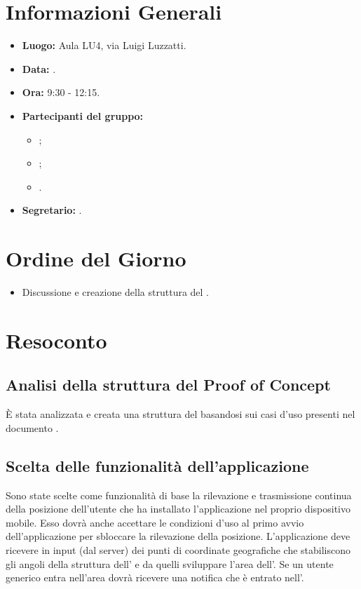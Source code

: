 \section{Informazioni Generali}
\begin{itemize}
\item \textbf{Luogo:} Aula LU4, via Luigi Luzzatti.
\item \textbf{Data:} \Data.
\item \textbf{Ora:} 9:30 - 12:15.
\item \textbf{Partecipanti del gruppo:}
	\begin{itemize}
		\item \DF{};
		\item \MC{};
		\item \SE{}.
	\end{itemize} 
\item \textbf{Segretario:} \MC{}.
\end{itemize}

\section{Ordine del Giorno}
\begin{itemize}
	\item Discussione e creazione della struttura del .
\end{itemize}


\section{Resoconto}
\subsection{Analisi della struttura del Proof of Concept}
È stata analizzata e creata una struttura del  basandosi sui casi d'uso presenti nel documento \AdR{}.

\subsection{Scelta delle funzionalità dell'applicazione}
Sono state scelte come funzionalità di base la rilevazione e trasmissione continua della posizione dell'utente che ha installato l'applicazione nel proprio dispositivo mobile. 
Esso dovrà anche accettare le condizioni d'uso al primo avvio dell'applicazione per sbloccare la rilevazione della posizione. L'applicazione deve ricevere in input (dal server) 
dei punti di coordinate geografiche che stabiliscono gli angoli della struttura dell' e da quelli sviluppare l'area dell'.
Se un utente generico entra nell'area dovrà ricevere una notifica che è entrato nell'.

\clearpage